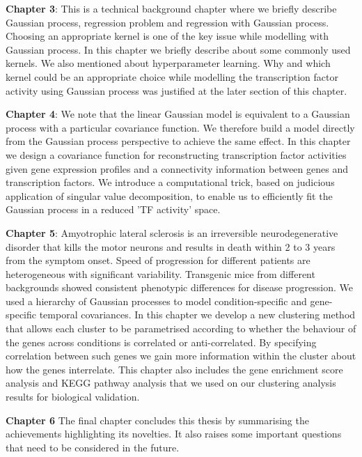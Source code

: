 \textbf{Chapter 3}:
This is a technical background chapter where we briefly describe Gaussian process, regression problem and
regression with Gaussian process. Choosing an appropriate kernel is one of the key issue while modelling
with Gaussian process. In this chapter we briefly describe about some commonly used kernels. We also 
mentioned about hyperparameter learning. Why and which kernel could be an appropriate choice while 
modelling the transcription factor activity using Gaussian process was justified at the later section of 
this chapter.

\textbf{Chapter 4}:
We note that the linear Gaussian model is equivalent to a Gaussian process with a particular covariance 
function. We therefore build a model directly from the Gaussian process perspective to achieve the same 
effect. In this chapter we design a covariance function for reconstructing transcription factor activities 
given gene expression profiles and a connectivity information between genes and transcription factors. 
We introduce a computational trick, based on  judicious application of singular value 
decomposition, to enable us to efficiently fit the Gaussian process in a reduced 'TF activity' space. 

\textbf{Chapter 5}:
Amyotrophic lateral sclerosis is an irreversible neurodegenerative disorder that kills the
motor neurons and results in death within 2 to 3 years from the symptom onset.  Speed of progression 
for different patients are heterogeneous with significant variability. Transgenic mice from different 
backgrounds showed consistent phenotypic differences for disease progression. We used a hierarchy 
of Gaussian processes to model condition-specific and gene-specific temporal covariances.
In this chapter we develop a new clustering method that allows each cluster to be parametrised 
according to whether the behaviour of the genes across conditions is correlated or anti-correlated. 
By specifying correlation between such genes we gain more information within the cluster about 
how the genes interrelate. This chapter also includes the gene enrichment score analysis and KEGG
pathway analysis that we used on our clustering analysis results for biological validation.

\textbf{Chapter 6}
The final chapter concludes this thesis by summarising the achievements highlighting its novelties.
It also raises some important questions that need to be considered in the future.

% 

